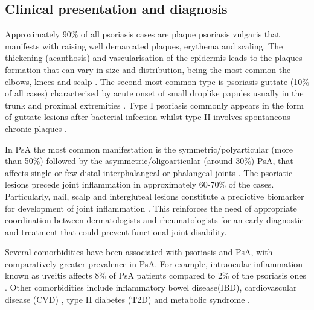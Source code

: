 \subsection{Clinical presentation and diagnosis}
%
Approximately 90\% of all psoriasis cases are plaque psoriasis vulgaris that manifests with raising well demarcated plaques, erythema and scaling. The thickening (acanthosis) and vascularisation of the epidermis leads to the plaques formation \parencite{Perera2012} that can vary in size and distribution, being the most common the elbows, knees and scalp \parencite{Griffiths2007}. The second most common type is psoriasis guttate (10\% of all cases) characterised by acute onset of small droplike papules usually in the trunk and proximal extremities \parencite{Vence2015}. Type I psoriasis commonly appears in the form of guttate lesions after bacterial infection whilst type II involves spontaneous chronic plaques \parencite{Perera2012}. %

In PsA the most common manifestation is the symmetric/polyarticular (more than 50\%) followed by the asymmetric/oligoarticular (around 30\%) PsA, that affects single or few distal interphalangeal or phalangeal joints \parencite{Reich2009, McGonagle2011}. The psoriatic lesions precede joint inflammation in approximately 60-70\% of the cases\parencite{Gladman2005, McGonagle,2011}. Particularly, nail, scalp and intergluteal lesions constitute a predictive biomarker for development of joint inflammation \parencite{Moll1976,Griffiths2007,McGonagle,2011}. This reinforces the need of appropriate coordination between dermatologists and rheumatologists for an early diagnostic and treatment that could prevent functional joint disability.

Several comorbidities have been associated with psoriasis and PsA, with comparatively greater prevalence in PsA. For example, intraocular inflammation known as uveitis affects 8\% of PsA patients compared to 2\% of the psoriasis ones \parencite{Husted2011, Oliveira2015}. Other comorbidities include inflammatory bowel disease(IBD), cardiovascular disease (CVD) \parencite{Gelfand2006}, type II diabetes (T2D) \parencite{Saphiro2007} and metabolic syndrome \parencite{Cohrn20017}. %

